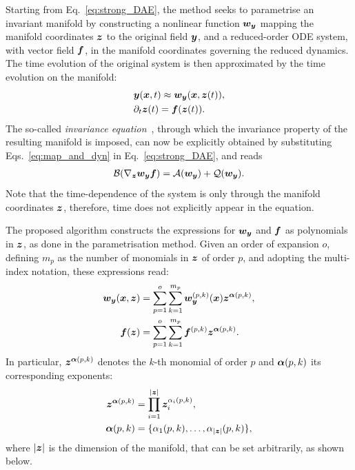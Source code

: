 \documentclass[%
reprint,
superscriptaddress,
 amsmath,amssymb,
 aps,
 pre
]{revtex4-2}
\begin{document}
Starting from Eq.~\eqref{eq:strong_DAE}, the method seeks to parametrise an invariant manifold by constructing a nonlinear function $\boldsymbol{w}_{\boldsymbol{y}}$ mapping the manifold coordinates ${\boldsymbol{z}}$ to the original field ${\boldsymbol{y}}$, and a reduced-order ODE system, with vector field $\boldsymbol{f}$, in the manifold coordinates governing the reduced dynamics. The time evolution of the original system is then approximated by the time evolution on the manifold:
\begin{subequations}
\label{eq:map_and_dyn}
\begin{align}
    &{\boldsymbol{y}}({\boldsymbol{x}}, t) \approx \boldsymbol{w}_{\boldsymbol{y}}({\boldsymbol{x}},{\boldsymbol{z}}(t)),\\
    &\partial_t {\boldsymbol{z}}(t)=\boldsymbol{f}({\boldsymbol{z}}(t)).
\end{align}
\end{subequations}
The so-called \textit{invariance equation}~\cite{Haro}, through which the invariance property of the resulting manifold is imposed, can now be explicitly obtained by substituting Eqs.~\eqref{eq:map_and_dyn} in Eq.~\eqref{eq:strong_DAE}, and reads
\begin{align}
\label{eq:invariance}
    \mathcal{B} 
    (\nabla_{\boldsymbol{z}} \boldsymbol{w}_{\boldsymbol{y}} \boldsymbol{f} )
    = 
    \mathcal{A}(\boldsymbol{w}_{\boldsymbol{y}}) + \mathcal{Q}(\boldsymbol{w}_{\boldsymbol{y}}).
\end{align}
Note that the time-dependence of the system is only through the manifold coordinates ${\boldsymbol{z}}$, therefore, time does not explicitly appear in the equation.


The proposed algorithm constructs the expressions for $\boldsymbol{w}_{\boldsymbol{y}}$ and $\boldsymbol{f}$ as polynomials in ${\boldsymbol{z}}$, as done in the parametrisation method. Given an order of expansion $o$, defining $m_p$ as the number of monomials in ${\boldsymbol{z}}$ of order $p$, and adopting the multi-index notation, these expressions read:
\begin{subequations}
\label{eq:poly_expansion_map_and_dyn}
\begin{align}
    \boldsymbol{w}_{\boldsymbol{y}}({\boldsymbol{x}},{\boldsymbol{z}})
    &= 
    \sum_{p=1}^o \sum_{k=1}^{m_p}
    \boldsymbol{w}_{\boldsymbol{y}}^{(p,k)}({\boldsymbol{x}}) {\boldsymbol{z}}^{\boldsymbol{\alpha}(p,k)},\\ 
    \boldsymbol{f}({\boldsymbol{z}}) &= 
    \sum_{p=1}^o \sum_{k=1}^{m_p}
    \boldsymbol{f}^{(p,k)} {\boldsymbol{z}}^{\boldsymbol{\alpha}(p,k)}.
\end{align}
\end{subequations}
In particular, ${\boldsymbol{z}}^{\boldsymbol{\alpha}(p,k)}$ denotes the $k$-th monomial of order $p$ and $\boldsymbol{\alpha}(p,k)$ its corresponding exponents:
\begin{align*}
    {\boldsymbol{z}}^{\boldsymbol{\alpha}(p,k)} &= \prod_{i=1}^{|{\boldsymbol{z}}|}{\boldsymbol{z}}_i^{\alpha_i(p,k)},\\
    \boldsymbol{\alpha}(p,k) &= \{\alpha_1(p,k), \ldots, \alpha_{|{\boldsymbol{z}}|}(p,k)\},
\end{align*}
where $|{\boldsymbol{z}}|$ is the dimension of the manifold, that can be set arbitrarily, as shown below.
\end{document}
